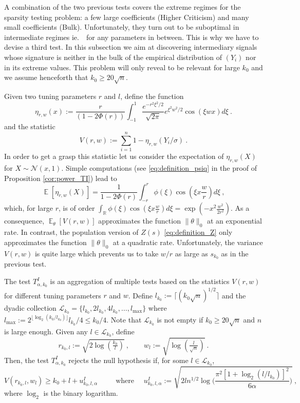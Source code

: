 \documentclass[twoside,11pt]{article}
\def\beq{\begin{equation}}
\def\eeq{\end{equation}}
\def\cL{\mathcal{L}}
\def\cN{\mathcal{N}}
\def\bbR{\mathbb{R}}
\newcommand{\E}{\operatorname{\mathbb{E}}}
\newcommand{\<}{\langle}
\renewcommand{\>}{\rangle}
\begin{document}
A combination of the two previous tests covers the extreme regimes for the sparsity testing problem: a few large coefficients (Higher Criticism) and many small coefficients (Bulk). Unfortunately, they turn out to be suboptimal in intermediate regimes ie.\ ~for any parameters in between. This is why we have to devise a third test. In this subsection we aim at discovering intermediary signals whose signature is neither in the bulk of the empirical distribution of $(Y_{i})$ nor in its extreme values. This problem will only reveal to be relevant for large $k_0$ and  we assume henceforth that $k_0\geq 20\sqrt{n}$. 





Given two tuning parameters $r$ and $l$, define the function 
\beq\label{eq:def_eta}
\eta_{r,w}(x):= \frac{r}{(1-2\Phi(r))}\int_{-1}^1 \frac{e^{-r^2\xi^2/2}}{\sqrt{2\pi}} e^{\xi^2 w^2/2 }\cos(\xi  w x)d\xi\ .
\eeq
and the statistic
\[V(r,w):= \sum_{i=1}^n 1 - \eta_{r,w}(Y_i/\sigma)\ .\]
In order to get a grasp this statistic let us consider the expectation of $\eta_{r,w}(X)$ for $X\sim \cN(x,1)$. Simple computations (see \eqref{eq:definition_psiq} in the proof of Proposition \ref{cor:power_TI}) lead to 
\[
  \E[\eta_{r,w} (X)]= \frac{1}{1-2\Phi(r)}\int_{-r}^{r} \phi(\xi)\cos(\xi x \frac{w}{r} )d\xi\ , 
\]
which, for large $r$, is of order $\int_{\bbR} \phi(\xi) \cos(\xi x \frac{w}{r})d\xi= \exp(-x^2\tfrac{w^2}{2r^2})$. As a consequence, $\E_{\theta}[V(r,w)]$ approximates the function $\|\theta\|_0$ at an exponential rate. 
In contrast, the population version of $Z(s)$ \eqref{eq:definition_Z} only approximates the function $\|\theta\|_0$ at a quadratic rate. Unfortunately, the variance $V(r,w)$ is quite large which prevents us to take 
 $w/r$ as large as $s_{k_0}$ as in the previous test. 





The test $T^{I}_{\alpha,k_0}$ is an aggregation of multiple tests based on the statistics $V(r,w)$ for different tuning parameters $r$ and $w$. Define
 $l_{k_0}:= \lceil (k_0\sqrt{n})^{1/2}\rceil$ and the dyadic collection $\cL_{k_0}=\{l_{k_0}, 2l_{k_0},4l_{k_0}, \ldots, l_{\max}\}$ where $l_{\max}:=  2^{\lfloor \log_2 (k_0/l_{k_0})\rfloor} l_{k_0}/4 \leq k_0/4$. Note that $\cL_{k_0}$ is not empty if $k_0\geq 20 \sqrt{n}$ and $n$ is large enough.
Given any $l\in \cL_{k_0}$, define 
\beq \label{eq:param}
 r_{k_0,l} :=  \sqrt{2\log(\tfrac{k_0}{l})} \ , \quad \quad w_l := \sqrt{\log(\tfrac{l}{\sqrt{n}})}\ .
\eeq
 Then, the test $T^{I}_{\alpha,k_0}$ rejects the null hypothesis if, for some $l \in \cL_{k_0}$, 
\beq\label{eq:rejection_intermediary}
  V(r_{k_0,l},w_l) \geq k_0+ l+ u^{I}_{k_0,l,\alpha} \, \quad \quad\text{ where } \quad u^{I}_{k_0,l,\alpha}:=\sqrt{2 ln^{1/2}\log\Big(\frac{\pi^2 [1+\log_2(l/l_{k_0})]^2}{6\alpha}\Big)}\ ,
\eeq
where $\log_2$ is the binary logarithm.
\end{document}
